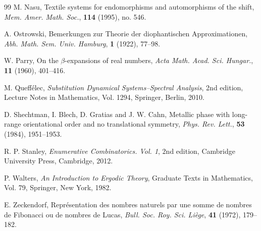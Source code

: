 \begin{thebibliography}{99}
M. Nasu, Textile systems for endomorphisms and automorphisms of the shift, \textit{Mem. Amer. Math. Soc.}, \textbf{114} (1995), no. 546.

A. Ostrowski, Bemerkungen zur Theorie der diophantischen Approximationen, \textit{Abh. Math. Sem. Univ. Hamburg}, \textbf{1} (1922), 77--98.

W. Parry, On the $\beta$-expansions of real numbers, \textit{Acta Math. Acad. Sci. Hungar.}, \textbf{11} (1960), 401--416.

M. Queff\'elec, \textit{Substitution Dynamical Systems--Spectral Analysis}, 2nd edition, Lecture Notes in Mathematics, Vol. 1294, Springer, Berlin, 2010.

D. Shechtman, I. Blech, D. Gratias and J. W. Cahn, Metallic phase with long-range orientational order and no translational symmetry, \textit{Phys. Rev. Lett.}, \textbf{53} (1984), 1951--1953.

R. P. Stanley, \textit{Enumerative Combinatorics. Vol. 1}, 2nd edition, Cambridge University Press, Cambridge, 2012.

P. Walters, \textit{An Introduction to Ergodic Theory}, Graduate Texts in Mathematics, Vol. 79, Springer, New York, 1982.

E. Zeckendorf, Repr\'esentation des nombres naturels par une somme de nombres de Fibonacci ou de nombres de Lucas, \textit{Bull. Soc. Roy. Sci. Li\`ege}, \textbf{41} (1972), 179--182.

\end{thebibliography}
